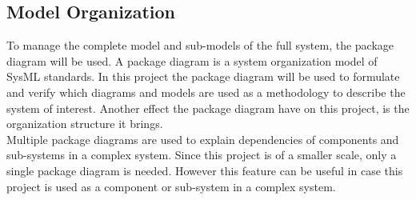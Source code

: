 \subsection{Model Organization}
To manage the complete model and sub-models of the full system, the package diagram will be used. A package diagram is a system organization model of SysML standards. In this project the package diagram will be used to formulate and verify which diagrams and models are used as a methodology to describe the system of interest. Another effect the package diagram have on this project, is the organization structure it brings.\\

Multiple package diagrams are used to explain dependencies of components and sub-systems in a complex system. Since this project is of a smaller scale, only a single package diagram is needed. However this feature can be useful in case this project is used as a component or sub-system in a complex system.